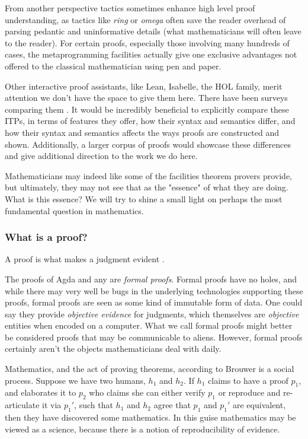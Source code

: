 From another perspective tactics sometimes enhance high level proof
understanding, as tactics like \emph{ring} or \emph{omega} often save the reader
overhead of parsing pedantic and uninformative details (what mathematicians will
often leave to the reader). For certain proofs, especially those involving many
hundreds of cases, the metaprogramming facilities actually give one exclusive
advantages not offered to the classical mathematician using pen and paper.

Other interactive proof assistants, like Lean, Isabelle, the HOL family, merit
attention we don't have the space to give them here. There have been surveys
comparing them \cite{10.5555/1121735}. It would be incredibly beneficial to
explicitly compare these ITPs, in terms of features they offer, how their syntax
and semantics differ, and how their syntax and semantics affects the ways proofs
are constructed and shown. Additionally, a larger corpus of proofs would
showcase these differences and give additional direction to the work we do here.

Mathematicians may indeed like some of the facilities theorem provers provide,
but ultimately, they may not see that as the "essence" of what they are doing.
What is this essence? We will try to shine a small light on perhaps the most
fundamental question in mathematics.

\subsubsection{What is a proof?}

\begin{displayquote}

A proof is what makes a judgment evident \cite{mlMeanings}.

\end{displayquote}

The proofs of Agda and any are \emph{formal proofs}. Formal proofs have no
holes, and while there may very well be bugs in the underlying technologies
supporting these proofs, formal proofs are seen as some kind of immutable form
of data. One could say they provide \emph{objective evidence} for judgments,
which themselves are \emph{objective} entities when encoded on a computer. What
we call formal proofs might better be considered proofs that may be communicable
to aliens. However, formal proofs certainly aren't the objects mathematicians
deal with daily.

Mathematics, and the act of proving theorems, according to Brouwer is a social
process. Suppose we have two humans, $h_1$ and $h_2$. If $h_1$ claims to have a
proof $p_1$, and elaborates it to $p_2$ who claims she can either verify $p_1$
or reproduce and re-articulate it via $p_1'$, such that $h_1$ and $h_2$ agree
that $p_1$ and $p_1'$ are equivalent, then they have discovered some
mathematics. In this guise mathematics may be viewed as a science,
because there is a notion of reproducibility of evidence.

